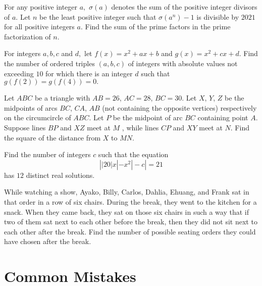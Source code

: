 \documentclass[mast]{lucky}
\begin{document}
\begin{prob}[AIME I 2021/14]{6}
For any positive integer $a,$ $\sigma(a)$ denotes the sum of the positive integer divisors of $a.$ Let $n$ be the least positive integer such that $\sigma(a^n)-1$ is divisible by $2021$ for all positive integers $a.$ Find the sum of the prime factors in the prime factorization of $n.$
\end{prob}

\begin{prob}[AIME I 2020/11]{9}
For integers $a,b,c$ and $d,$ let $f(x)=x^2+ax+b$ and $g(x)=x^2+cx+d.$ Find the number of ordered triples $(a,b,c)$ of integers with absolute values not exceeding $10$ for which there is an integer $d$ such that $g(f(2))=g(f(4))=0.$
\end{prob}

\begin{prob}{9}
Let $ABC$ be a triangle with $AB=26$, $AC=28$, $BC=30$. Let $X$, $Y$, $Z$ be the midpoints of arcs $BC$, $CA$, $AB$ (not containing the opposite vertices) respectively on the circumcircle of $ABC$. Let $P$ be the midpoint of arc $BC$ containing point $A$. Suppose lines $BP$ and $XZ$ meet at $M$ , while lines $CP$ and $XY$ meet at $N$. Find the square of the distance from $X$ to $MN$.
\end{prob}

\begin{prob}[AIME I 2021/8]{13}
Find the number of integers $c$ such that the equation $$\left||20|x|-x^2|-c\right|=21$$has $12$ distinct real solutions.
\end{prob}

\begin{prob}[AIME II 2020/9]{13}
While watching a show, Ayako, Billy, Carlos, Dahlia, Ehuang, and Frank sat in that order in a row of six chairs. During the break, they went to the kitchen for a snack. When they came back, they sat on those six chairs in such a way that if two of them sat next to each other before the break, then they did not sit next to each other after the break. Find the number of possible seating orders they could have chosen after the break.
\end{prob}


\pagebreak

\section{Common Mistakes}
\end{document}
